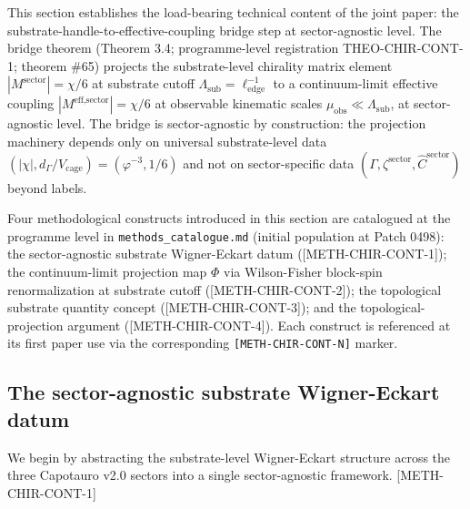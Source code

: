 \documentclass[11pt,letterpaper]{article}
\newcommand{\Lambdasub}{\Lambda_{\text{sub}}}
\newcommand{\muobs}{\mu_{\text{obs}}}
\newcommand{\elledge}{\ell_{\text{edge}}}
\newcommand{\Vcage}{V_{\text{cage}}}
\newcommand{\dGamma}{d_\Gamma}
\newcommand{\methref}[1]{\textsf{\small[\textsc{#1}]}}
\begin{document}
This section establishes the load-bearing technical content of the joint paper: the substrate-handle-to-effective-coupling bridge step at sector-agnostic level. The bridge theorem (Theorem 3.4; programme-level registration THEO-CHIR-CONT-1; \cite{ResearchFrontier} theorem \#65) projects the substrate-level chirality matrix element $|M^{\text{sector}}| = \chi/6$ at substrate cutoff $\Lambdasub = \elledge^{-1}$ to a continuum-limit effective coupling $|M^{\text{eff,sector}}| = \chi/6$ at observable kinematic scales $\muobs \ll \Lambdasub$, at sector-agnostic level. The bridge is sector-agnostic by construction: the projection machinery depends only on universal substrate-level data $(|\chi|, \dGamma/\Vcage) = (\varphi^{-3}, 1/6)$ and not on sector-specific data $(\Gamma, \zeta^{\text{sector}}, \hat{C}^{\text{sector}})$ beyond labels.

Four methodological constructs introduced in this section are catalogued at the programme level in \texttt{methods\_catalogue.md} \cite{MethodsCatalogue} (initial population at Patch 0498): the sector-agnostic substrate Wigner-Eckart datum (\methref{METH-CHIR-CONT-1}); the continuum-limit projection map $\Phi$ via Wilson-Fisher block-spin renormalization at substrate cutoff (\methref{METH-CHIR-CONT-2}); the topological substrate quantity concept (\methref{METH-CHIR-CONT-3}); and the topological-projection argument (\methref{METH-CHIR-CONT-4}). Each construct is referenced at its first paper use via the corresponding \texttt{[METH-CHIR-CONT-N]} marker.

\subsection{The sector-agnostic substrate Wigner-Eckart datum}
\label{sec:sector_agnostic_datum}

We begin by abstracting the substrate-level Wigner-Eckart structure \cite{WignerEckart} across the three Capotauro v2.0 sectors \cite{Capotauro} into a single sector-agnostic framework. \methref{METH-CHIR-CONT-1}
\end{document}
